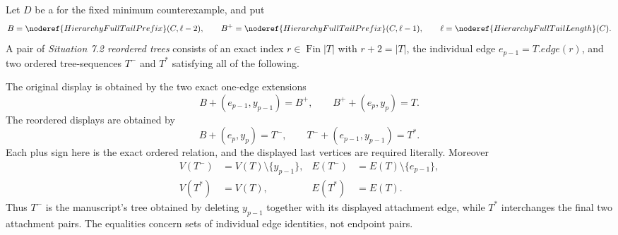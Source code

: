 \begin{definition}
Let \(D\) be a  for the fixed
minimum counterexample, and put
\[
 B=\noderef{HierarchyFullTailPrefix}(C,\ell-2),\qquad
 B^+=\noderef{HierarchyFullTailPrefix}(C,\ell-1),\qquad
 \ell=\noderef{HierarchyFullTailLength}(C).
\]
A pair of \emph{Situation 7.2 reordered trees} consists of an exact
index \(r\in\operatorname{Fin}|T|\) with \(r+2=|T|\), the individual
edge \(e_{p-1}=T.\mathit{edge}(r)\), and two ordered tree-sequences
\(T^-\) and \(T^*\) satisfying all of the following.

The original display is obtained by the two exact one-edge extensions
\[
 B\mathbin{+}(e_{p-1},y_{p-1})=B^+,\qquad
 B^+\mathbin{+}(e_p,y_p)=T.
\]
The reordered displays are obtained by
\[
 B\mathbin{+}(e_p,y_p)=T^-,\qquad
 T^-\mathbin{+}(e_{p-1},y_{p-1})=T^*.
\]
Each plus sign here is the exact ordered
 relation, and the displayed last
vertices are required literally.  Moreover
\[
 \begin{aligned}
 V(T^-)&=V(T)\setminus\{y_{p-1}\},&
 E(T^-)&=E(T)\setminus\{e_{p-1}\},\\
 V(T^*)&=V(T),& E(T^*)&=E(T).
 \end{aligned}
\]
Thus \(T^-\) is the manuscript's tree obtained by deleting
\(y_{p-1}\) together with its displayed attachment edge, while \(T^*\)
interchanges the final two attachment pairs.  The equalities concern
sets of individual edge identities, not endpoint pairs.
\end{definition}
